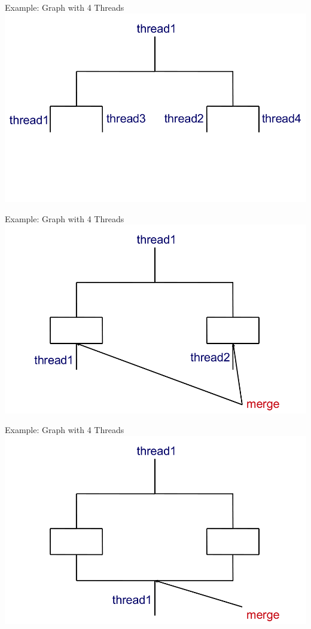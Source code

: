 \begin{frame}{Example: Graph with 4 Threads}
  \includegraphics[width=\textwidth]{figures/thread-3}
\end{frame}

\begin{frame}{Example: Graph with 4 Threads}
  \includegraphics[width=\textwidth]{figures/thread-4}
\end{frame}

\begin{frame}{Example: Graph with 4 Threads}
  \includegraphics[width=\textwidth]{figures/thread-5}
\end{frame}


